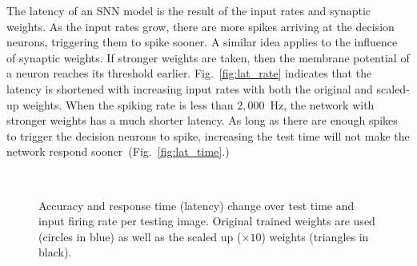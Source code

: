 The latency of an SNN model is the result of the input rates and synaptic weights.
As the input rates grow, there are more spikes arriving at the decision neurons, triggering them to spike sooner.
A similar idea applies to the influence of synaptic weights. If stronger weights are taken, then the membrane potential of a neuron reaches its threshold earlier.
Fig.~\ref{fig:lat_rate} indicates that the latency is shortened with increasing input rates with both the original and scaled-up weights.
When the spiking rate is less than $2,000$~Hz, the network with stronger weights has a much shorter latency.
As long as there are enough spikes to trigger the decision neurons to spike, increasing the test time will not make the network respond sooner~(Fig.~\ref{fig:lat_time}.)
	\begin{figure}[htb!]
	  \centering
	  	  \\
	  \caption{Accuracy and response time (latency) change over test time and input firing rate per testing image. Original trained weights are used (circles in blue) as well as the scaled up ($\times10$) weights (triangles in black). }
	  \label{fig:assess}
	\end{figure}

